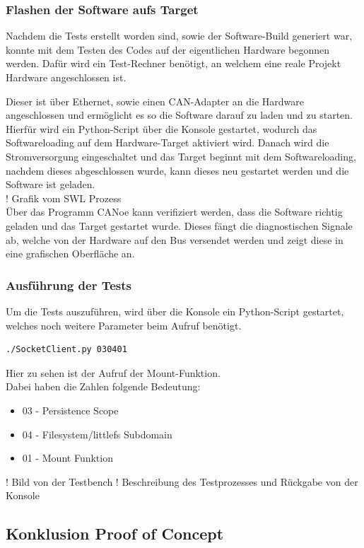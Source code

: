 
\subsubsection{Flashen der Software aufs Target}
Nachdem die Tests erstellt worden sind, sowie der Software-Build generiert war, konnte mit dem Testen des Codes auf der eigentlichen Hardware begonnen werden.
Dafür wird ein Test-Rechner benötigt, an welchem eine reale Projekt Hardware angeschlossen ist.

Dieser ist über Ethernet, sowie einen CAN-Adapter an die Hardware angeschlossen und ermöglicht es so die Software darauf zu laden und zu starten.
Hierfür wird ein Python-Script über die Konsole gestartet, wodurch das Softwareloading auf dem Hardware-Target aktiviert wird.
Danach wird die Stromversorgung eingeschaltet und das Target beginnt mit dem Softwareloading, nachdem dieses abgeschlossen wurde, kann dieses neu gestartet werden und die Software ist geladen.\\

! Grafik vom SWL Prozess\\

Über das Programm CANoe kann verifiziert werden, dass die Software richtig geladen und das Target gestartet wurde.
Dieses fängt die diagnostischen Signale ab, welche von der Hardware auf den Bus versendet werden und zeigt diese in eine grafischen Oberfläche an.\\

\subsubsection{Ausführung der Tests}
Um die Tests auszuführen, wird über die Konsole ein Python-Script gestartet, welches noch weitere Parameter beim Aufruf benötigt.\\

\begin{lstlisting}[language=bash, basicstyle=\tiny]
	./SocketClient.py 030401
\end{lstlisting}
Hier zu sehen ist der Aufruf der Mount-Funktion.\\

Dabei haben die Zahlen folgende Bedeutung:
\begin{itemize}
	\item 03 - Persistence Scope
	\item 04 - Filesystem/littlefs Subdomain
	\item 01 - Mount Funktion
\end{itemize}

! Bild von der Testbench
! Beschreibung des Testprozesses und Rückgabe von der Konsole


\subsection{Konklusion Proof of Concept}
\label{section:konklusion}
